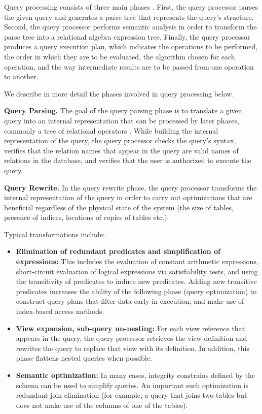 Query processing consists of three main phases \cite{hellerstein:databasearchitecture, kossmann:distqeuryprocessing}.
First, the query processor parses the given query and generates a parse tree that represents the query's structure.
Second, the query processor performs semantic analysis in order to transform the parse tree into a relational algebra expression tree.
Finally, the query processor produces a query execution plan,
which indicates the operations to be performed, the order in which they are to be evaluated,
the algorithm chosen for each operation, and the way intermediate results are to be passed from one operation to another.

\noindent
We describe in more detail the phases involved in query processing below.

\bigskip
\noindent
\textbf{Query Parsing.}
The goal of the query parsing phase is to translate a given query into an internal representation that can
be processed by later phases, commonly a tree of relational operators \cite{silberschatz:dbbook}.
While building the internal representation of the query,
the query processor checks the query's syntax,
verifies that the relation names that appear in the query are valid names of relations in the database,
and verifies that the user is authorized to execute the query.

\bigskip
\noindent
\textbf{Query Rewrite.}
In the query rewrite phase, the query processor transforms the internal representation of the query in order to carry
out optimizations that are beneficial regardless of the physical state of the system
(the size of tables, presence of indices, locations of copies of tables etc.).

Typical transformations include:
\begin{itemize}
  \item \textbf{Elimination of redundant predicates and simplification of expressions:}
  This includes the evaluation of constant arithmetic expressions,
  short-circuit evaluation of logical expressions via satisfiability tests,
  and using the transitivity of predicates to induce new predicates.
  Adding new transitive predicates increases the ability of the following phase (query optimization) to construct query
  plans that filter data early in execution, and make use of index-based access methods.

  \item \textbf{View expansion, sub-query un-nesting:}
  For each view reference that appears in the query, the query processor retrieves the view definition and rewrites the
  query to replace that view with its definition.
  In addition, this phase flattens nested queries when possible.

  \item \textbf{Semantic optimization:}
  In many cases, integrity constrains defined by the schema can be used to simplify queries.
  An important such optimization is redundant join elimination (for example, a query that joins two tables but does not
  make use of the columns of one of the tables).
\end{itemize}

